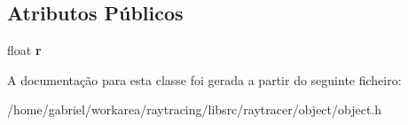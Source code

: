 \subsection*{Atributos Públicos}
\begin{DoxyCompactItemize}
\item 
\mbox{\label{classSphere_a2b1b412591a00eb30cb012e444f7192d}} 
float {\bfseries r}
\end{DoxyCompactItemize}


A documentação para esta classe foi gerada a partir do seguinte ficheiro\+:\begin{DoxyCompactItemize}
\item 
/home/gabriel/workarea/raytracing/libsrc/raytracer/object/object.\+h\end{DoxyCompactItemize}
